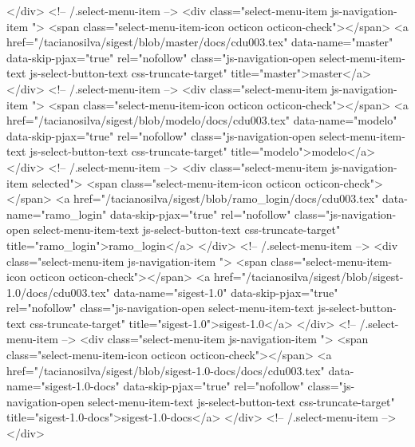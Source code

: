             </div> <!-- /.select-menu-item -->
            <div class="select-menu-item js-navigation-item ">
              <span class="select-menu-item-icon octicon octicon-check"></span>
              <a href="/tacianosilva/sigest/blob/master/docs/cdu003.tex"
                 data-name="master"
                 data-skip-pjax="true"
                 rel="nofollow"
                 class="js-navigation-open select-menu-item-text js-select-button-text css-truncate-target"
                 title="master">master</a>
            </div> <!-- /.select-menu-item -->
            <div class="select-menu-item js-navigation-item ">
              <span class="select-menu-item-icon octicon octicon-check"></span>
              <a href="/tacianosilva/sigest/blob/modelo/docs/cdu003.tex"
                 data-name="modelo"
                 data-skip-pjax="true"
                 rel="nofollow"
                 class="js-navigation-open select-menu-item-text js-select-button-text css-truncate-target"
                 title="modelo">modelo</a>
            </div> <!-- /.select-menu-item -->
            <div class="select-menu-item js-navigation-item selected">
              <span class="select-menu-item-icon octicon octicon-check"></span>
              <a href="/tacianosilva/sigest/blob/ramo_login/docs/cdu003.tex"
                 data-name="ramo_login"
                 data-skip-pjax="true"
                 rel="nofollow"
                 class="js-navigation-open select-menu-item-text js-select-button-text css-truncate-target"
                 title="ramo_login">ramo_login</a>
            </div> <!-- /.select-menu-item -->
            <div class="select-menu-item js-navigation-item ">
              <span class="select-menu-item-icon octicon octicon-check"></span>
              <a href="/tacianosilva/sigest/blob/sigest-1.0/docs/cdu003.tex"
                 data-name="sigest-1.0"
                 data-skip-pjax="true"
                 rel="nofollow"
                 class="js-navigation-open select-menu-item-text js-select-button-text css-truncate-target"
                 title="sigest-1.0">sigest-1.0</a>
            </div> <!-- /.select-menu-item -->
            <div class="select-menu-item js-navigation-item ">
              <span class="select-menu-item-icon octicon octicon-check"></span>
              <a href="/tacianosilva/sigest/blob/sigest-1.0-docs/docs/cdu003.tex"
                 data-name="sigest-1.0-docs"
                 data-skip-pjax="true"
                 rel="nofollow"
                 class="js-navigation-open select-menu-item-text js-select-button-text css-truncate-target"
                 title="sigest-1.0-docs">sigest-1.0-docs</a>
            </div> <!-- /.select-menu-item -->
        </div>

